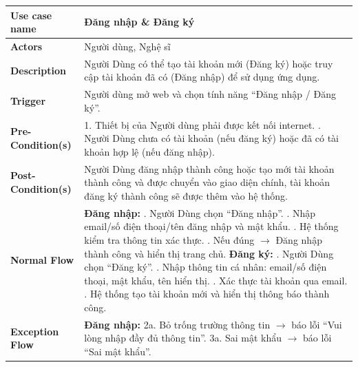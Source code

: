 \documentclass[a4paper]{article}
\begin{document}


\begin{table}[h!]
\centering
\renewcommand{\arraystretch}{1.3} %
\begin{tabularx}{\textwidth}{|l|X|}
\hline
\textbf{Use case name} & Đăng nhập \& Đăng ký \\ \hline
\textbf{Actors}        & Người dùng, Nghệ sĩ \\ \hline
\textbf{Description}   & Người Dùng có thể tạo tài khoản mới (Đăng ký) hoặc truy cập tài khoản đã có (Đăng nhập) để sử dụng ứng dụng. \\ \hline
\textbf{Trigger}       & Người dùng mở web và chọn tính năng “Đăng nhập / Đăng ký”. \\ \hline
\textbf{Pre-Condition(s)} 
& 1. Thiết bị của Người dùng phải được kết nối internet. \newline
  2. Người Dùng chưa có tài khoản (nếu đăng ký) hoặc đã có tài khoản hợp lệ (nếu đăng nhập). \\ \hline
\textbf{Post-Condition(s)} 
& Người Dùng đăng nhập thành công hoặc tạo mới tài khoản thành công và được chuyển vào giao diện chính, tài khoản đăng ký thành công sẽ được thêm vào hệ thống. \\ \hline
\textbf{Normal Flow}   
& \textbf{Đăng nhập:} \newline
  1. Người Dùng chọn “Đăng nhập”. \newline
  2. Nhập email/số điện thoại/tên đăng nhập và mật khẩu. \newline
  3. Hệ thống kiểm tra thông tin xác thực. \newline
  4. Nếu đúng $\rightarrow$ Đăng nhập thành công và hiển thị trang chủ. \newline
  \textbf{Đăng ký:} \newline
  1. Người Dùng chọn “Đăng ký”. \newline
  2. Nhập thông tin cá nhân: email/số điện thoại, mật khẩu, tên hiển thị. \newline
  3. Xác thực tài khoản qua email. \newline
  4. Hệ thống tạo tài khoản mới và hiển thị thông báo thành công. \\ \hline
\textbf{Exception Flow} 
& \textbf{Đăng nhập:} \newline
  2a. Bỏ trống trường thông tin $\rightarrow$ báo lỗi “Vui lòng nhập đầy đủ thông tin”. \newline
  3a. Sai mật khẩu $\rightarrow$ báo lỗi “Sai mật khẩu”. \newline

\end{tabularx}
\end{table}
\end{document}
